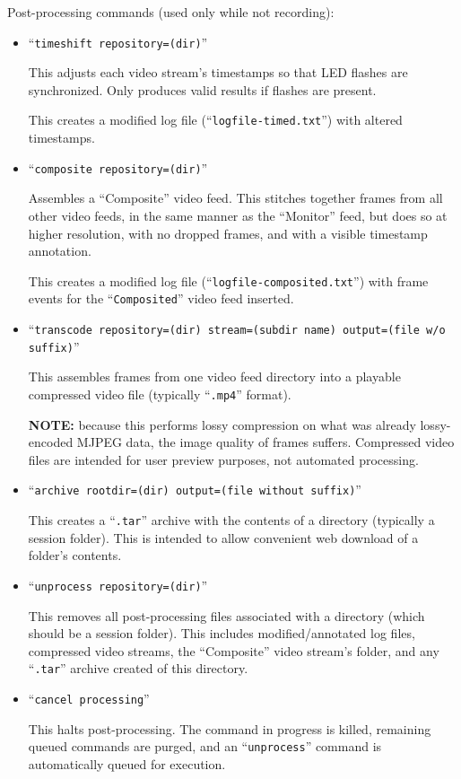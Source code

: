 Post-processing commands (used only while not recording):
\begin{itemize}
\item ``\verb+timeshift repository=(dir)+''

This adjusts each video stream's timestamps so that LED flashes are 
synchronized. Only produces valid results if flashes are present.

This creates a modified log file (``\verb+logfile-timed.txt+'') with 
altered timestamps.

\item ``\verb+composite repository=(dir)+''

Assembles a ``Composite'' video feed. This stitches together frames from all
other video feeds, in the same manner as the ``Monitor'' feed, but does so at
higher resolution, with no dropped frames, and with a visible timestamp 
annotation.

This creates a modified log file (``\verb+logfile-composited.txt+'') with
frame events for the ``\verb+Composited+'' video feed inserted.

\item 
``\verb+transcode repository=(dir) stream=(subdir name) output=(file w/o suffix)+''

This assembles frames from one video feed directory into a playable compressed
video file (typically ``\verb+.mp4+'' format).

\textbf{NOTE:} because this performs lossy compression on what was already 
lossy-encoded MJPEG data, the image quality of frames suffers. Compressed 
video files are intended for user preview purposes, not automated processing.

\item ``\verb+archive rootdir=(dir) output=(file without suffix)+''

This creates a ``\verb+.tar+'' archive with the contents of a directory
(typically a session folder). This is intended to allow convenient web 
download of a folder's contents.

\item ``\verb+unprocess repository=(dir)+''

This removes all post-processing files associated with a directory (which
should be a session folder). This includes modified/annotated log files,
compressed video streams, the ``Composite'' video stream's folder, and any
``\verb+.tar+'' archive created of this directory.

\item ``\verb+cancel processing+''

This halts post-processing. The command in progress is killed, remaining
queued commands are purged, and an ``\verb+unprocess+'' command is
automatically queued for execution.
%
\end{itemize}

